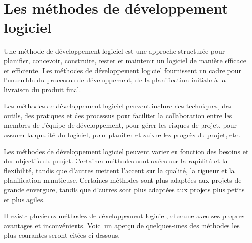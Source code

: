 \section{Les méthodes de développement logiciel}\label{subsec:methode-de-developpement-logiciel}
Une méthode de développement logiciel est une approche structurée pour planifier, concevoir, construire, tester et maintenir un logiciel de manière efficace et efficiente. Les méthodes de développement logiciel fournissent un cadre pour l'ensemble du processus de développement, de la planification initiale à la livraison du produit final.

Les méthodes de développement logiciel peuvent inclure des techniques, des outils, des pratiques et des processus pour faciliter la collaboration entre les membres de l'équipe de développement, pour gérer les risques de projet, pour assurer la qualité du logiciel, pour planifier et suivre les progrès du projet, etc.

Les méthodes de développement logiciel peuvent varier en fonction des besoins et des objectifs du projet. Certaines méthodes sont axées sur la rapidité et la flexibilité, tandis que d'autres mettent l'accent sur la qualité, la rigueur et la planification minutieuse. Certaines méthodes sont plus adaptées aux projets de grande envergure, tandis que d'autres sont plus adaptées aux projets plus petits et plus agiles.

Il existe plusieurs méthodes de développement logiciel, chacune avec ses propres avantages et inconvénients. Voici un aperçu de quelques-unes des méthodes les plus courantes seront citées ci-dessous.

